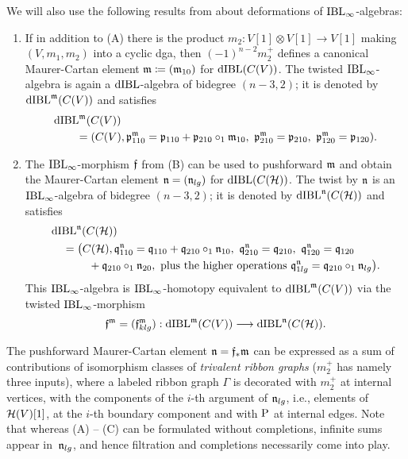 \documentclass[\MainFolder/Text.tex]{subfiles}
\begin{document}
We will also use the following results from \cite[Proposition~12.5 and Theorem~12.9]{Cieliebak2015} about deformations of $\mathrm{IBL}_\infty$-algebras:
\begin{enumerate}[resume,listparindent=\parindent,label=\textbf{(\Alph*)}]
 \item If in addition to (A) there is the product $m_2 : V[1]\otimes V[1] \rightarrow V[1]$ making $(V,m_1,m_2)$ into a cyclic dga, then $(-1)^{n-2} m_2^+$ defines a canonical Maurer-Cartan element $\mathfrak{m}\coloneqq(\mathfrak{m}_{10})$ for $\mathrm{dIBL}(C(V))$. The twisted $\mathrm{IBL}_\infty$-algebra is again a $\mathrm{dIBL}$-algebra of bidegree $(n-3,2)$; it is denoted by $\mathrm{dIBL}^{\mathfrak{m}}(C(V))$ and satisfies
\begin{equation} \label{Eq:CanonMCTwist}
\begin{aligned}
&\dIBL^\MC(\CycC(V)) \\ 
&\qquad = (\CycC(V),\OPP^\MC_{110}=\OPP_{110}+\OPP_{210}\circ_1\MC_{10},\ \OPP^\MC_{210}=\OPP_{210},\ \OPP^\MC_{120} = \OPP_{120}).
\end{aligned}
\end{equation}
\item The $\mathrm{IBL}_\infty$-morphism $\mathfrak{f}$ from (B) can be used to pushforward $\mathfrak{m}$ and obtain the Maurer-Cartan element $\mathfrak{n} = (\mathfrak{n}_{lg})$ for $\mathrm{dIBL}(C(\mathcal{H}))$. The twist by $\mathfrak{n}$ is an $\mathrm{IBL}_\infty$-algebra of bidegree $(n-3,2)$; it is denoted by $\mathrm{dIBL}^{\mathfrak{n}}(C(\mathcal{H}))$ and satisfies
$$\begin{aligned}
& \dIBL^\PMC(\CycC(\Harm)) \\
& \quad = \begin{multlined}[t]
\bigl(\CycC(\Harm), \OPQ_{110}^\PMC = \OPQ_{110} + \OPQ_{210}\circ_1 \PMC_{10},\ \OPQ_{210}^\PMC=\OPQ_{210},\ \OPQ_{120}^\PMC = \OPQ_{120} \\+ \OPQ_{210} \circ_1 \PMC_{20},
\text{ plus the higher operations }\OPQ_{1lg}^\PMC = \OPQ_{210}\circ_1 \PMC_{lg} \bigr).
\end{multlined} \end{aligned} $$
This $\mathrm{IBL}_\infty$-algebra is $\mathrm{IBL}_\infty$-homotopy equivalent to $\mathrm{dIBL}^{\mathfrak{m}}(C(V))$ via the twisted $\mathrm{IBL}_\infty$-morphism 
$$\mathfrak{f}^{\mathfrak{m}}=(\mathfrak{f}^{\mathfrak{m}}_{klg}): \mathrm{dIBL}^{\mathfrak{m}}(C(V)) \longrightarrow \mathrm{dIBL}^{\mathfrak{n}}(C(\mathcal{H})). $$
\end{enumerate}

The pushforward Maurer-Cartan element $\mathfrak{n} = \mathfrak{f}_* \mathfrak{m}$ can be expressed as a sum of contributions of isomorphism classes of \emph{trivalent ribbon graphs} ($m_2^+$ has namely three inputs), where a labeled ribbon graph $\Gamma$ is decorated with $m_2^+$ at internal vertices, with the components of the $i$-th argument of $\mathfrak{n}_{lg}$, i.e., elements of $\mathcal{H}(V)[1]$, at the $i$-th boundary component and with $\mathrm{P}$ at internal edges.
Note that whereas  (A) -- (C) can be formulated without completions, infinite sums appear in~$\mathfrak{n}_{lg}$, and hence filtration and completions necessarily come into play.
\end{document}
